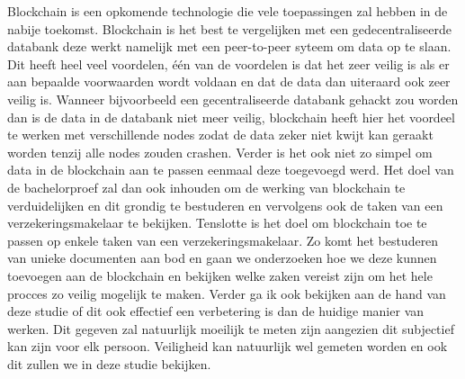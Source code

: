 Blockchain is een opkomende technologie die vele toepassingen zal hebben in de nabije toekomst. Blockchain is het best te vergelijken met een gedecentraliseerde databank deze werkt namelijk met een peer-to-peer syteem om data op te slaan. Dit heeft heel veel voordelen, één van de voordelen is dat het zeer veilig is als er aan bepaalde voorwaarden wordt voldaan en dat de data dan uiteraard ook zeer veilig is. Wanneer bijvoorbeeld een gecentraliseerde databank gehackt zou worden dan is de data in de databank niet meer veilig, blockchain heeft hier het voordeel te werken met verschillende nodes zodat de data zeker niet kwijt kan geraakt worden tenzij alle nodes zouden crashen. Verder is het ook niet zo simpel om data in de blockchain aan te passen eenmaal deze toegevoegd werd. Het doel van de bachelorproef zal dan ook inhouden om de werking van blockchain te verduidelijken en dit grondig te bestuderen en vervolgens ook de taken van een verzekeringsmakelaar te bekijken. Tenslotte is het doel om blockchain toe te passen op enkele taken van een verzekeringsmakelaar. Zo komt het bestuderen van unieke documenten aan bod en gaan we onderzoeken hoe we deze kunnen toevoegen aan de blockchain en bekijken welke zaken vereist zijn om het hele procces zo veilig mogelijk te maken. Verder ga ik ook bekijken aan de hand van deze studie of dit ook effectief een verbetering is dan de huidige manier van werken. Dit gegeven zal natuurlijk moeilijk te meten zijn aangezien dit subjectief kan zijn voor elk persoon. Veiligheid kan natuurlijk wel gemeten worden en ook dit zullen we in deze studie bekijken. 

